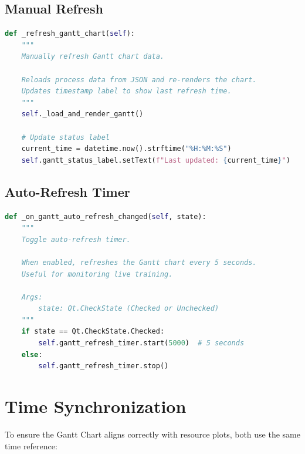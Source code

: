 \documentclass[11pt,a4paper]{article}
\begin{document}
\subsection{Manual Refresh}

\begin{lstlisting}[language=Python]
def _refresh_gantt_chart(self):
    """
    Manually refresh Gantt chart data.
    
    Reloads process data from JSON and re-renders the chart.
    Updates timestamp label to show last refresh time.
    """
    self._load_and_render_gantt()
    
    # Update status label
    current_time = datetime.now().strftime("%H:%M:%S")
    self.gantt_status_label.setText(f"Last updated: {current_time}")
\end{lstlisting}

\subsection{Auto-Refresh Timer}

\begin{lstlisting}[language=Python]
def _on_gantt_auto_refresh_changed(self, state):
    """
    Toggle auto-refresh timer.
    
    When enabled, refreshes the Gantt chart every 5 seconds.
    Useful for monitoring live training.
    
    Args:
        state: Qt.CheckState (Checked or Unchecked)
    """
    if state == Qt.CheckState.Checked:
        self.gantt_refresh_timer.start(5000)  # 5 seconds
    else:
        self.gantt_refresh_timer.stop()
\end{lstlisting}

\section{Time Synchronization}

To ensure the Gantt Chart aligns correctly with resource plots, both use the same time reference:
\end{document}
